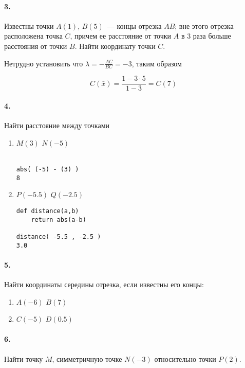 
\paragraph{3.} Известны точки $A(1)$, $B(5)$\ --- концы отрезка $AB$; вне этого
отрезка расположена точка $C$, причем ее расстояние от точки $A$ в 3 раза больше
расстояния от точки $B$. Найти координату точки $C$.

Нетрудно установить что $\lambda = -\frac{AC}{BC} = -3$, таким образом

\begin{equation}
C(\bar x) = \frac{1-3 \cdot 5}{1-3} = C(7) 
\end{equation}


\paragraph{4.} Найти расстояние между точками

\begin{enumerate}
  \item $M(3)$ $N(-5)$
   
  \py\\\verb|abs( (-5) - (3) )|\\\verb|8|
  \item $P(-5.5)$ $Q(-2.5)$
  
  \py
  \begin{verbatim}
def distance(a,b)
    return abs(a-b)

distance( -5.5 , -2.5 )
3.0
\end{verbatim}
\end{enumerate}

\paragraph{5.} Найти координаты середины отрезка, если известны его
концы:
\begin{enumerate}
  \item $A(-6)$ $B(7)$
  \item $C(-5)$ $D(0.5)$
\end{enumerate}


\paragraph{6.} Найти точку $M$, симметричную точке $N(-3)$ относительно точки
$P(2)$.

